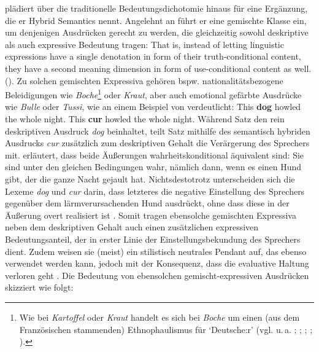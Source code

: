 \citet[]{Gutzmann.2011} plädiert über die traditionelle Bedeutungsdichotomie hinaus für eine Ergänzung, die er \glqq{}Hybrid Semantics\grqq{} nennt. Angelehnt an {\citet[]{McCready.2010}} führt er eine gemischte Klasse ein, um denjenigen Ausdrücken gerecht zu werden, die gleichzeitig sowohl deskriptive als auch expressive Bedeutung tragen: \glqq{}That is, instead of letting linguistic expressions have a single denotation in form of their truth-conditional content, they have a second meaning dimension in form of use-conditional content as well.\grqq{} (\citealt[13] {Gutzmann.2019a}). Zu solchen gemischten Expressiva gehören bspw. nationalitätsbezogene Beleidigungen wie \textit{Boche}\footnote{Wie bei \textit{Kartoffel} oder \textit{Kraut} handelt es sich bei \textit{Boche} um einen (aus dem Französischen stammenden) Ethnophaulismus für `Deutsche:r' (vgl. u.\,a. \citealt[134]{Hornsby.2001}; \citealt[2]{McCready.2010}; \citealt[132]{Gutzmann.2011}; \citealt[]{Anderson.2013}; \citealt[54]{Miscevic.2017}).} oder \textit{Kraut}, aber auch emotional gefärbte Ausdrücke wie \textit{Bulle} oder \textit{Tussi}, wie \citet[131]{Gutzmann.2011} an einem Beispiel von \citet[]{Frege.1892} verdeutlicht:
\ea
\ea This \textbf{dog} howled the whole night. \label{hund}
\ex This \textbf{cur} howled the whole night. \label{koeter}
 \z
 \z
Während Satz  den rein deskriptiven Ausdruck \textit{dog} beinhaltet, teilt Satz  mithilfe des semantisch hybriden Ausdrucks \textit{cur} zusätzlich zum deskriptiven Gehalt die Verärgerung des Sprechers mit. {\citet[12]{Gutzmann.2019a}} erläutert, dass beide Äußerungen wahrheitskonditional äquivalent sind: Sie sind unter den gleichen Bedingungen wahr, nämlich dann, wenn es einen Hund gibt, der die ganze Nacht gejault hat. Nichtsdestotrotz unterscheiden sich die Lexeme \textit{dog} und \textit{cur} darin, dass letzteres die negative Einstellung des Sprechers gegenüber dem lärmverursachenden Hund ausdrückt, ohne dass diese in der Äußerung overt realisiert ist {\citep[vgl.][12]{Gutzmann.2019a}}. Somit tragen ebensolche gemischten Expressiva neben dem deskriptiven Gehalt auch einen zusätzlichen expressiven Bedeutungsanteil, der in erster Linie der Einstellungsbekundung des Sprechers dient. Zudem weisen sie (meist) ein stilistisch neutrales Pendant auf, das ebenso verwendet werden kann, jedoch mit der Konsequenz, dass die evaluative Haltung verloren geht \citep[vgl.][131]{Gutzmann.2011}. Die Bedeutung von ebensolchen gemischt-expressiven Ausdrücken skizziert {\citet[13]{Gutzmann.2019a}} wie folgt: \medskip


